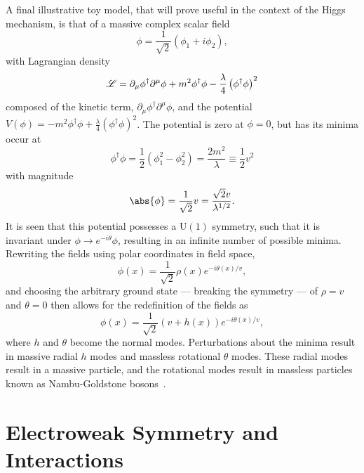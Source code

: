 A final illustrative toy model, that will prove useful in the context of the Higgs mechanism, is that of a massive complex scalar field
\[
 \phi = \frac{1}{\sqrt{2}} \left(\phi_{1} + i \phi_{2}\right),
\]
with Lagrangian density
\[
 \mathscr{L} = \partial_{\mu}\phi^{\dagger}\partial^{\mu}\phi + m^{2}\phi^{\dagger}\phi - \frac{\lambda}{4} \left(\phi^{\dagger}\phi\right)^{2}
\]
composed of the kinetic term, $\partial_{\mu}\phi^{\dagger}\partial^{\mu}\phi$, and the potential $V\left(\phi\right) = -m^{2}\phi^{\dagger}\phi + \frac{\lambda}{4} \left(\phi^{\dagger}\phi\right)^{2}$.
The potential is zero at $\phi=0$, but has its minima occur at
\[
 \phi^{\dagger}\phi = \frac{1}{2}\left(\phi_{1}^{2} - \phi_{2}^{2}\right) = \frac{2m^2}{\lambda} \equiv \frac{1}{2}v^{2}
\]
with magnitude
\[
 \abs{\phi} = \frac{1}{\sqrt{2}}v = \frac{\sqrt{2} v}{\lambda^{1/2}}.
\]
It is seen that this potential possesses a $\mathrm{U}(1)$ symmetry, such that it is invariant under $\phi \to e^{-i\theta}\phi$, resulting in an infinite number of possible minima.
Rewriting the fields using polar coordinates in field space,
\[
 \phi(x) = \frac{1}{\sqrt{2}} \rho\left(x\right) e^{-i \theta(x)/v},
\]
and choosing the arbitrary ground state --- breaking the symmetry --- of $\rho=v$ and $\theta=0$ then allows for the redefinition of the fields as
\[
 \phi(x) = \frac{1}{\sqrt{2}} \left(v + h\left(x\right)\right) e^{-i \theta(x)/v},
\]
where $h$ and $\theta$ become the normal modes.
Perturbations about the minima result in massive radial $h$ modes and massless rotational $\theta$ modes.
These radial modes result in a massive particle, and the rotational modes result in massless particles known as Nambu-Goldstone bosons~\cite{Nambu:1960tm,Goldstone:1961eq}.

\section{Electroweak Symmetry and Interactions}\label{section:EW_interactions}


